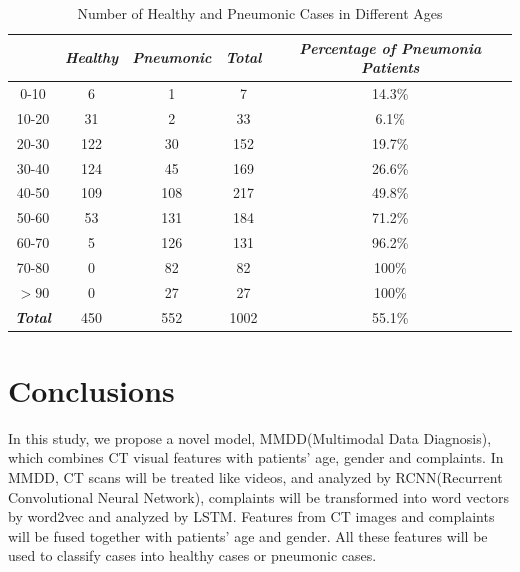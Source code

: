 \documentclass[runningheads]{llncs}
\begin{document}
\begin{table}[htb]
    \vspace{-0cm}
    \caption{Number of Healthy and Pneumonic Cases in Different Ages}
    \vspace{-0cm}
    \begin{center}
    \begin{tabular}{|c|c|c|c|c|}
        \hline
        \textbf{\textit{}} & \textbf{\textit{Healthy}} & \textbf{\textit{Pneumonic}}& \textbf{\textit{Total}}& \textbf{\textit{Percentage of Pneumonia Patients}} \\
    \hline
    0-10 & 6 & 1 & 7 & 14.3\%\\
    10-20 & 31 & 2 & 33 & 6.1\%\\
    20-30 & 122 & 30 & 152 & 19.7\%\\
    30-40 & 124 & 45 & 169 &26.6\%\\
    40-50 & 109 & 108 & 217 &49.8\%\\
    50-60 & 53 & 131 & 184 &71.2\%\\
    60-70 & 5 & 126 & 131 &96.2\%\\
    70-80 & 0 & 82 & 82 &100\%\\
    $>90$& 0 & 27 & 27 &100\%\\
    \hline 
    \textbf{\textit{Total}} & 450 & 552 & 1002 & 55.1\% \\
    
    \hline
    \end{tabular}
    \vspace{-0.0cm}
    \label{differentages}
    \end{center}
    \vspace{-0.0cm}
    \end{table}

\section{Conclusions}
\label{conclude}
In this study, we propose a novel model, MMDD(Multimodal Data Diagnosis), which combines CT visual features with patients' age, gender and complaints. In MMDD, CT scans will be treated like videos, and analyzed by RCNN(Recurrent Convolutional Neural Network), complaints will be transformed into word vectors by word2vec and analyzed by LSTM. Features from CT images and complaints will be fused together with patients' age and gender. All these features will be used to classify cases into healthy cases or pneumonic cases.
\end{document}
